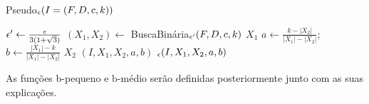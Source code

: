 \begin{algorithm}[H]
    \caption{\sc Pseudo$_\epsilon(I = (F,D,c,k))$}
    \begin{algorithmic}[1]
       \State $\epsilon' \gets \frac{\epsilon}{3(1 +\sqrt{3})}$
        \State $(X_1,X_2) \gets$ {\sc BuscaBinária$_{\epsilon'}(F,D,c,k)$}
        \State \Return $X_1$
        \EndIf
        \State $a \gets \frac{k - |X_2|}{|X_1| - |X_2|};$ \quad $b \gets \frac{|X_1| - k}{|X_1| - |X_2|}$
            \State \Return $X_2$
        \EndIf
            \State {}$(I,X_1,X_2,a,b)$
        \Else
            \State {}$_\epsilon(I,X_1,X_2,a,b)$
        \EndIf
    \end{algorithmic}
\end{algorithm}
As funções {\sc b-pequeno} e {\sc b-médio} serão definidas posteriormente junto com as suas explicações.

